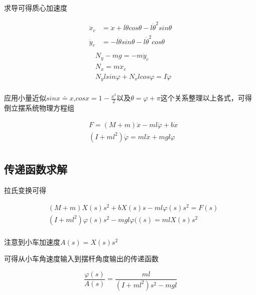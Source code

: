 求导可得质心加速度

\begin{equation}
\begin{aligned}
\ddot x_c&=\ddot x+l\ddot{\theta}cos\theta-l\dot{\theta}^2sin\theta\\
\ddot y_c&=-l\ddot{\theta}sin\theta-l\dot{\theta}^2cos\theta\\
\end{aligned}
\end{equation}
\begin{equation}
\begin{aligned}
&N_y-mg=-m\ddot y_c\\
&N_x=m\ddot x_c\\
&N_ylsin\varphi+N_xlcos\varphi=I\ddot{\varphi}\\
\end{aligned}
\end{equation}

应用小量近似$sinx\doteq x$,$cosx=1-\frac{x^2}{2}$以及$\theta=\varphi+\pi$这个关系整理以上各式，可得倒立摆系统物理方程组

\begin{equation}
\begin{aligned}
&F=(M+m)\ddot x-ml\ddot{\varphi}+b\dot x\\
&(I+ml^2)\ddot{\varphi}=ml\ddot x+mgl\varphi\\
\end{aligned}
\end{equation}

\subsection{传递函数求解}
拉氏变换可得

\begin{equation}
\begin{aligned}
&(M+m)X(s)s^2+bX(s)s-ml\varphi(s)s^2=F(s)\\
&(I+ml^2)\varphi(s)s^2-mgl\varphi((s)=mlX(s)s^2\\
\end{aligned}
\end{equation}

注意到小车加速度$A(s)=X(s)s^2$

可得从小车角速度输入到摆杆角度输出的传递函数

\begin{equation}
\frac{\varphi(s)}{A(s)}=\frac{ml}{(I+ml^2)s^2-mgl}
\end{equation}

